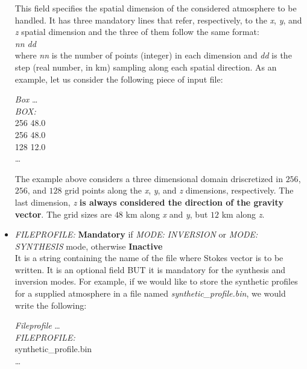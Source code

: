\begin{itemize}
  This field specifies the spatial dimension of the considered atmosphere to be handled. It has three mandatory lines that refer, respectively, to the {\it x}, {\it y}, and {\it z} spatial dimension and the three of them follow the same format:\\

  {\it nn   dd}\\

  where {\it nn} is the number of points (integer) in each dimension and {\it dd } is the step (real number, in km) sampling along each spatial direction. As an example, let us consider the following piece of input file:\\

\begin{ifbox}[label={tb:box}]{{\it Box}}
  \scriptsize
  \ldots\\
  {\it BOX:}\\
  256 48.0\\
  256 48.0\\
  128 12.0\\
  \ldots
  \normalsize
\end{ifbox}

  The example above considers a three dimensional domain driscretized in {\it $256$}, {\it $256$}, and {\it $128$} grid points along the {\it x}, {\it y}, and {\it z} dimensions, respectively. The last dimension, {\it z} {\bf is always considered the direction of the gravity vector}. The grid sizes are {\it $48$} km along {\it x} and {\it y}, but {\it $12$} km along {\it z}.\\

  \item {\it FILEPROFILE:} {\bf Mandatory} if {\it MODE:} {\it INVERSION} or {\it MODE:} {\it SYNTHESIS} mode, otherwise {\bf Inactive}\\
  
  It is a string containing the name of the file where Stokes vector is to be written. It is an optional field BUT it is mandatory for the synthesis and inversion modes. For example, if we would like to store the synthetic profiles for a supplied atmosphere in a file named {\it synthetic\_profile.bin}, we would write the following:\\
 

\begin{ifbox}[label={tb:box}]{{\it Fileprofile}}
  \scriptsize
  \ldots\\
  {\it FILEPROFILE:}\\
  synthetic\_profile.bin\\
  \ldots
  \normalsize
\end{ifbox}


\end{itemize}
